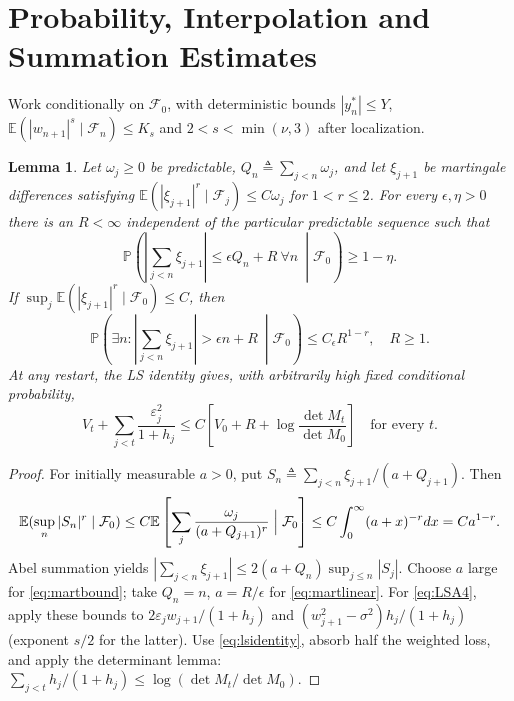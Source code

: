 \documentclass[11pt,reqno]{amsart}
\numberwithin{equation}{section}
\newtheorem{lemma}[theorem]{Lemma}
\theoremstyle{definition}
\theoremstyle{remark}
\newcommand{\E}{\mathbb E}
\newcommand{\Prob}{\mathbb P}
\newcommand{\F}{\mathcal F}
\begin{document}
\appendix
\section{Probability, Interpolation and Summation Estimates}\label{sec:prob}
Work conditionally on $\F_0$, with deterministic bounds $|y_n^*|\le Y$, $\E(|w_{n+1}|^s\mid\F_n)\le K_s$ and $2<s<\min(\nu,3)$ after localization.

\begin{lemma}\label{lem:mart}
Let $\omega_j\ge0$ be predictable, $Q_n\triangleq\sum_{j<n}\omega_j$, and let $\xi_{j+1}$ be martingale differences satisfying $\E(|\xi_{j+1}|^r\mid\F_j)\le C\omega_j$ for $1<r\le2$. For every $\epsilon,\eta>0$ there is an $R<\infty$ independent of the particular predictable sequence such that
\begin{equation}\label{eq:martbound}
 \Prob\left(\left|\sum_{j<n}\xi_{j+1}\right|\le\epsilon Q_n+R\ \forall n\ \middle|\F_0\right)\ge1-\eta.
\end{equation}
If $\sup_j\E(|\xi_{j+1}|^r\mid\F_0)\le C$, then
\begin{equation}\label{eq:martlinear}
 \Prob\left(\exists n:\left|\sum_{j<n}\xi_{j+1}\right|>\epsilon n+R\ \middle|\F_0\right)\le C_\epsilon R^{1-r},\quad R\ge1.
\end{equation}
At any restart, the LS identity gives, with arbitrarily high fixed conditional probability,
\begin{equation}\label{eq:LSA4}
 V_t+\sum_{j<t}\frac{\varepsilon_j^2}{1+h_j}
 \le C\left[V_0+R+\log\frac{\det M_t}{\det M_0}\right]\quad\text{for every }t.
\end{equation}
\end{lemma}
\begin{proof}
For initially measurable $a>0$, put $S_n\triangleq\sum_{j<n}\xi_{j+1}/(a+Q_{j+1})$. Then
\[
 \E(\sup_n|S_n|^r\mid\F_0)
 \le C\E\left[\sum_j\frac{\omega_j}{(a+Q_{j+1})^r}\Bigm|\F_0\right]
 \le C\int_0^\infty(a+x)^{-r}dx=Ca^{1-r}.
\]
Abel summation yields
$|\sum_{j<n}\xi_{j+1}|\le2(a+Q_n)\sup_{j\le n}|S_j|$.
Choose $a$ large for \eqref{eq:martbound}; take $Q_n=n$, $a=R/\epsilon$ for \eqref{eq:martlinear}.
For \eqref{eq:LSA4}, apply these bounds to $2\varepsilon_jw_{j+1}/(1+h_j)$ and $(w_{j+1}^2-\sigma^2)h_j/(1+h_j)$ (exponent $s/2$ for the latter). Use \eqref{eq:lsidentity}, absorb half the weighted loss, and apply the determinant lemma: $\sum_{j<t}h_j/(1+h_j)\le\log(\det M_t/\det M_0)$.
\end{proof}
\end{document}
